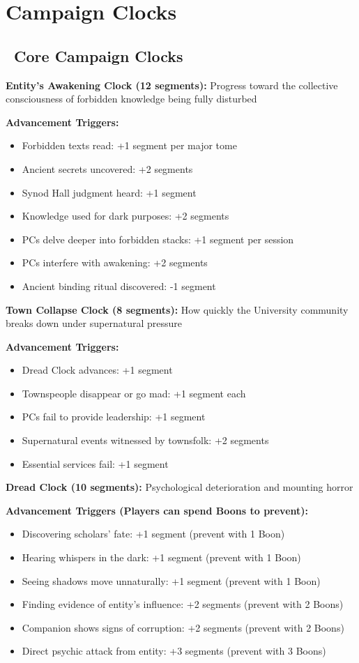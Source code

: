 \documentclass[11pt]{article}
\begin{document}
\section{Campaign Clocks}

\subsection*{\faClock\ Core Campaign Clocks}

\textbf{Entity's Awakening Clock (12 segments):}
Progress toward the collective consciousness of forbidden knowledge being fully disturbed

\textbf{Advancement Triggers:}
\begin{itemize}
    \item Forbidden texts read: +1 segment per major tome
    \item Ancient secrets uncovered: +2 segments
    \item Synod Hall judgment heard: +1 segment
    \item Knowledge used for dark purposes: +2 segments
    \item PCs delve deeper into forbidden stacks: +1 segment per session
    \item PCs interfere with awakening: +2 segments
    \item Ancient binding ritual discovered: -1 segment
\end{itemize}

\textbf{Town Collapse Clock (8 segments):}
How quickly the University community breaks down under supernatural pressure

\textbf{Advancement Triggers:}
\begin{itemize}
    \item Dread Clock advances: +1 segment
    \item Townspeople disappear or go mad: +1 segment each
    \item PCs fail to provide leadership: +1 segment
    \item Supernatural events witnessed by townsfolk: +2 segments
    \item Essential services fail: +1 segment
\end{itemize}

\textbf{Dread Clock (10 segments):}
Psychological deterioration and mounting horror

\textbf{Advancement Triggers (Players can spend Boons to prevent):}
\begin{itemize}
    \item Discovering scholars' fate: +1 segment (prevent with 1 Boon)
    \item Hearing whispers in the dark: +1 segment (prevent with 1 Boon)
    \item Seeing shadows move unnaturally: +1 segment (prevent with 1 Boon)
    \item Finding evidence of entity's influence: +2 segments (prevent with 2 Boons)
    \item Companion shows signs of corruption: +2 segments (prevent with 2 Boons)
    \item Direct psychic attack from entity: +3 segments (prevent with 3 Boons)
\end{itemize}
\end{document}
